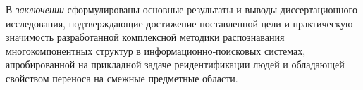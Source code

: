 В \emph{заключении} сформулированы основные результаты и выводы
диссертационного исследования, подтверждающие достижение поставленной
цели и практическую значимость разработанной комплексной методики
распознавания многокомпонентных структур в информационно‑поисковых
системах, апробированной на прикладной задаче реидентификации людей
и обладающей свойством переноса на смежные предметные области.